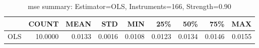 \begin{table}[ht]
\centering
\caption{mse summary: Estimator=OLS, Instruments=166, Strength=0.90}
\begin{tabular}{lrrrrrrrr}
\toprule
 & COUNT & MEAN & STD & MIN & 25\% & 50\% & 75\% & MAX \\
\midrule
OLS & 10.0000 & 0.0133 & 0.0016 & 0.0108 & 0.0123 & 0.0134 & 0.0146 & 0.0155 \\
\bottomrule
\end{tabular}
\end{table}
